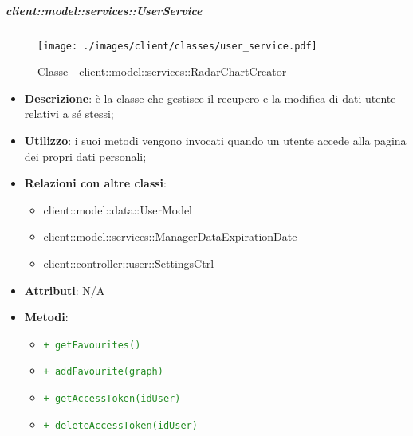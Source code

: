 		\subparagraph{client::model::services::UserService} %
		\label{subp:client_model_services_userservice}
		\begin{figure}[htbp]
				\centering
				\centerline{\texttt{[image: ./images/client/classes/user\_service.pdf]}}
				\caption{Classe - client::model::services::RadarChartCreator}
			\end{figure}
			\begin{itemize}
				\item \textbf{Descrizione}: è la classe che gestisce il recupero e la modifica di dati utente relativi a sé stessi;
				\item \textbf{Utilizzo}: i suoi metodi vengono invocati quando un utente accede alla pagina dei propri dati personali;
				\item \textbf{Relazioni con altre classi}:
					\begin{itemize}
						\item client::model::data::UserModel
						\item client::model::services::ManagerDataExpirationDate
						\item client::controller::user::SettingsCtrl
					\end{itemize}
				\item \textbf{Attributi}: N/A
				\item \textbf{Metodi}:
				\begin{itemize}
					\item \textcolor{forestgreen}{\texttt{+ getFavourites()}}
					\item \textcolor{forestgreen}{\texttt{+ addFavourite(graph)}}
					\item \textcolor{forestgreen}{\texttt{+ getAccessToken(idUser)}}
					\item \textcolor{forestgreen}{\texttt{+ deleteAccessToken(idUser)}}
					

\end{itemize}
\end{itemize}
